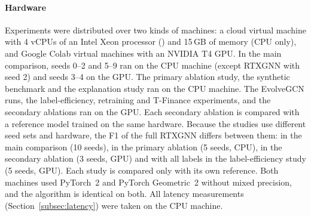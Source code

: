 \paragraph{Hardware} Experiments were distributed over two kinds of machines: a cloud virtual machine with 4 vCPUs of an Intel Xeon processor (\cpuName) and 15\,GB of memory (CPU only), and Google Colab virtual machines with an NVIDIA T4 GPU. In the main comparison, seeds 0--2 and 5--9 ran on the CPU machine (except RTXGNN with seed 2) and seeds 3--4 on the GPU. The primary ablation study, the synthetic benchmark and the explanation study ran on the CPU machine. The EvolveGCN runs, the label-efficiency, retraining and T-Finance experiments, and the secondary ablations ran on the GPU. Each secondary ablation is compared with a reference model trained on the same hardware. Because the studies use different seed sets and hardware, the F1 of the full RTXGNN differs between them: \rtxFone{} in the main comparison (10 seeds), \ablfullFone{} in the primary ablation (5 seeds, CPU), \ablGfullFone{} in the secondary ablation (3 seeds, GPU) and \lertxgnnOneZeroZero{} with all labels in the label-efficiency study (5 seeds, GPU). Each study is compared only with its own reference. Both machines used PyTorch~2 and PyTorch Geometric~2 without mixed precision, and the algorithm is identical on both. All latency measurements (Section~\ref{subsec:latency}) were taken on the CPU machine.
